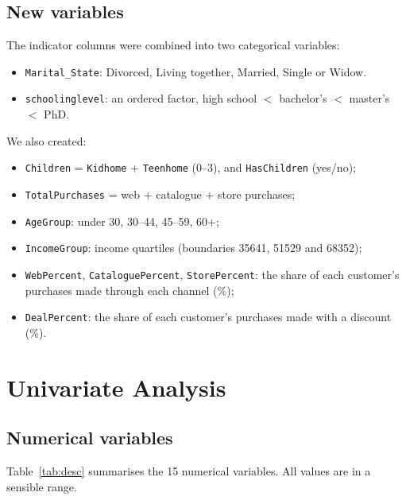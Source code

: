 \documentclass[11pt,a4paper]{article}
\begin{document}
\subsection{New variables}
\label{sec:newvars}
The indicator columns were combined into two categorical variables:
\begin{itemize}
	\item \texttt{Marital\_State}: Divorced, Living together, Married, Single or Widow.
	\item \texttt{schoolinglevel}: an ordered factor, high school $<$ bachelor's $<$ master's $<$ PhD.
\end{itemize}
We also created:
\begin{itemize}
	\item \texttt{Children} = \texttt{Kidhome} + \texttt{Teenhome} (0--3), and \texttt{HasChildren} (yes/no);
	\item \texttt{TotalPurchases} = web + catalogue + store purchases;
	\item \texttt{AgeGroup}: under 30, 30--44, 45--59, 60+;
	\item \texttt{IncomeGroup}: income quartiles (boundaries \num{35641}, \num{51529} and \num{68352});
	\item \texttt{WebPercent}, \texttt{CataloguePercent}, \texttt{StorePercent}: the share of each customer's purchases made through each channel (\%);
	\item \texttt{DealPercent}: the share of each customer's purchases made with a discount (\%).
\end{itemize}

\section{Univariate Analysis}

\subsection{Numerical variables}
Table~\ref{tab:desc} summarises the 15 numerical variables. All values are in a sensible range.
\end{document}
